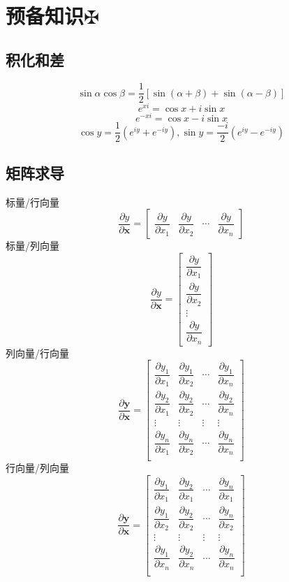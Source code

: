 \documentclass[11pt, a4paper, UTF8]{ctexart}
\begin{document}
\indent\\
\large
\raggedright
\def\fuck{\maltese}
\hypertarget{catalog}{}
\tableofcontents
\setcounter{secnumdepth}{-1}
\section{预备知识\protect\hyperlink{catalog}{$\fuck$}}
\subsection{积化和差}
\[\sin\alpha\cos\beta=\dfrac{1}{2}[\sin(\alpha+\beta)+\sin(\alpha-\beta)]\]
$$e^{xi}=\cos x+i\sin x$$
$$e^{-xi}=\cos x-i\sin x$$
$$\cos y=\dfrac{1}{2}(e^{iy}+e^{-iy}),\sin y=\dfrac{-i}{2}(e^{iy}-e^{-iy})$$
\subsection{矩阵求导}
标量/行向量\\
\[\dfrac{\partial y}{\partial\bm x}=
\begin{bmatrix}
\dfrac{\partial y}{\partial x_1}&\dfrac{\partial y}{\partial x_2}&\cdots&\dfrac{\partial y}{\partial x_n}
\end{bmatrix}
\]
标量/列向量\\
\[\dfrac{\partial y}{\partial\bm x}=
\begin{bmatrix}
\dfrac{\partial y}{\partial x_1}\\
\dfrac{\partial y}{\partial x_2}\\
\vdots\\
\dfrac{\partial y}{\partial x_n}
\end{bmatrix}
\]
列向量/行向量\\
\[\dfrac{\partial\bm y}{\partial\bm x}=
\begin{bmatrix}
\dfrac{\partial y_1}{\partial x_1}&\dfrac{\partial y_1}{\partial x_2}&\cdots&\dfrac{\partial y_1}{\partial x_n}\\
\dfrac{\partial y_2}{\partial x_1}&\dfrac{\partial y_2}{\partial x_2}&\cdots&\dfrac{\partial y_2}{\partial x_n}\\
\vdots&\vdots&\vdots&\vdots\\
\dfrac{\partial y_n}{\partial x_1}&\dfrac{\partial y_n}{\partial x_2}&\cdots&\dfrac{\partial y_n}{\partial x_n}\\
\end{bmatrix}
\]
行向量/列向量\\
\[\dfrac{\partial\bm y}{\partial\bm x}=
\begin{bmatrix}
\dfrac{\partial y_1}{\partial x_1}&\dfrac{\partial y_2}{\partial x_1}&\cdots&\dfrac{\partial y_n}{\partial x_1}\\
\dfrac{\partial y_1}{\partial x_2}&\dfrac{\partial y_2}{\partial x_2}&\cdots&\dfrac{\partial y_n}{\partial x_2}\\
\vdots&\vdots&\vdots&\vdots\\
\dfrac{\partial y_1}{\partial x_n}&\dfrac{\partial y_2}{\partial x_n}&\cdots&\dfrac{\partial y_n}{\partial x_n}\\
\end{bmatrix}
\]
\end{document}
